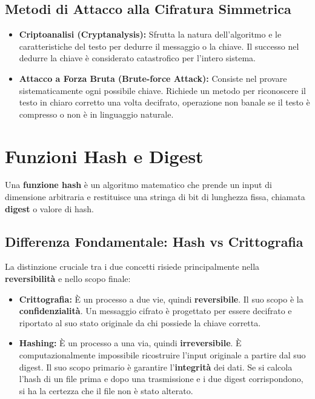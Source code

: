 \subsection{Metodi di Attacco alla Cifratura Simmetrica}
\begin{itemize}
    \item \textbf{Criptoanalisi (Cryptanalysis):} Sfrutta la natura dell'algoritmo e le caratteristiche del testo per dedurre il messaggio o la chiave. Il successo nel dedurre la chiave è considerato catastrofico per l'intero sistema.
    \item \textbf{Attacco a Forza Bruta (Brute-force Attack):} Consiste nel provare sistematicamente ogni possibile chiave. Richiede un metodo per riconoscere il testo in chiaro corretto una volta decifrato, operazione non banale se il testo è compresso o non è in linguaggio naturale.
\end{itemize}



\section{Funzioni Hash e Digest}
Una \textbf{funzione hash} è un algoritmo matematico che prende un input di dimensione arbitraria e restituisce una stringa di bit di lunghezza fissa, chiamata \textbf{digest} o valore di hash.

\subsection{Differenza Fondamentale: Hash vs Crittografia}
La distinzione cruciale tra i due concetti risiede principalmente nella \textbf{reversibilità} e nello scopo finale:

\begin{itemize}
    \item \textbf{Crittografia:} È un processo a due vie, quindi \textbf{reversibile}. Il suo scopo è la \textbf{confidenzialità}. Un messaggio cifrato è progettato per essere decifrato e riportato al suo stato originale da chi possiede la chiave corretta.
    \item \textbf{Hashing:} È un processo a una via, quindi \textbf{irreversibile}. È computazionalmente impossibile ricostruire l'input originale a partire dal suo digest. Il suo scopo primario è garantire l'\textbf{integrità} dei dati. Se si calcola l'hash di un file prima e dopo una trasmissione e i due digest corrispondono, si ha la certezza che il file non è stato alterato.
\end{itemize}

